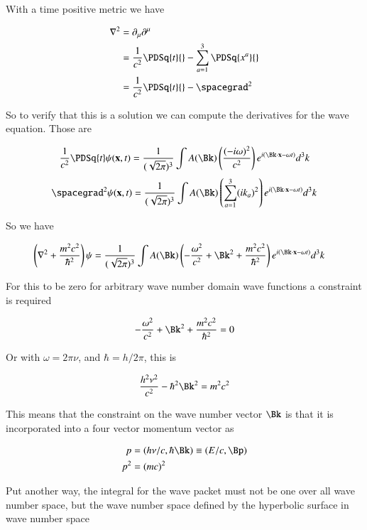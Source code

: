 With a time positive metric
we have

\begin{align*}
\grad^2
&= \partial_\mu\partial^\mu \\
&= \inv{c^2} \PDSq{t}{} - \sum_{a=1}^3 \PDSq{x^a}{} \\
&= \inv{c^2} \PDSq{t}{} - \spacegrad^2
\end{align*}

So to verify that this is a solution we can compute the derivatives for the wave equation.  Those are

\begin{align*}
\inv{c^2} \PDSq{t} \psi(\Bx,t) = \inv{(\sqrt{2\pi})^3}\int A(\Bk) \left( \frac{(-i\omega)^2}{c^2} \right) e^{ i (\Bk \cdot \Bx - \omega t)} d^3 k
\end{align*}
\begin{align*}
\spacegrad^2 \psi(\Bx,t) = \inv{(\sqrt{2\pi})^3}\int A(\Bk) \left(\sum_{a=1}^3 (i k_a)^2 \right)e^{ i (\Bk \cdot \Bx - \omega t)} d^3 k
\end{align*}

So we have

\begin{align*}
\left( \grad^2 + \frac{m^2 c^2}{\hbar^2} \right) \psi
&=
\inv{(\sqrt{2\pi})^3}\int A(\Bk) \left( -\frac{\omega^2}{c^2} + \Bk^2 + \frac{m^2 c^2}{\hbar^2}
\right)e^{ i (\Bk \cdot \Bx - \omega t)} d^3 k
\end{align*}

For this to be zero for arbitrary wave number domain wave functions a constraint is required

\begin{align*}
-\frac{\omega^2}{c^2} + \Bk^2 + \frac{m^2 c^2}{\hbar^2} = 0
\end{align*}

Or with $\omega = 2 \pi \nu$, and $\hbar = h/2\pi$, this is

\begin{align*}
\frac{h^2 \nu^2}{c^2} - \hbar^2 \Bk^2 = {m^2 c^2}
\end{align*}

This means that the constraint on the wave number vector $\Bk$ is that it is incorporated into a four vector momentum vector as

\begin{align*}
p &= (h \nu/c, \hbar \Bk) \equiv (E/c, \Bp)\\
p^2 &= (m c)^2
\end{align*}

Put another way, the integral for the wave packet must not be one over all wave number space, but the wave number space defined by the
hyperbolic surface in wave number space


